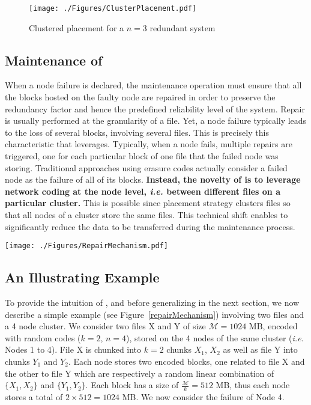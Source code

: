 \begin{figure}[t]    
\vspace{-0.8cm}
  \begin{center}    
 \texttt{[image: ./Figures/ClusterPlacement.pdf]} 
  \caption{Clustered placement for a $n=3$ redundant system}  
   \label{clusterPlacement}    
\end{center}     
   \end{figure}

\subsection{Maintenance of \crc}

When a node failure is declared, the maintenance operation must ensure that all the blocks hosted on the faulty node are repaired in order to preserve the redundancy factor and hence the predefined reliability level of the system. Repair is usually performed at the granularity of a file. Yet, a node failure typically leads to the loss of several blocks, involving several files. This is precisely this characteristic that \crc leverages. Typically, when a node fails,  multiple repairs are triggered, one for each particular block of one file that the failed node was storing.  Traditional approaches using erasure codes actually consider a failed node as the failure of all of its blocks.   \textbf{Instead, the novelty of \crc is to leverage network coding at the node level, \textit{i.e.} between different files on a particular cluster.} This is possible since \crc placement strategy clusters files so that all nodes of a cluster store the same files.  This technical shift enables to significantly reduce the data to be transferred during the maintenance process.

\begin{figure*}[t!] 
 \begin{center}    
 \texttt{[image: ./Figures/RepairMechanism.pdf]} 
    \caption{Example of a \crc repair process, for the repair of a new node in a cluster of $4$ (with $k=2, n=4$).}   
    \label{repairMechanism}   
  \end{center}     
   \end{figure*}
   
\subsection{An Illustrating Example}
To provide the intuition of \crc, and before generalizing in the next
section, we now describe a simple example (see
Figure~\ref{repairMechanism}) involving  two files and a 4 node
cluster.  We consider two files X and Y of size $\mathcal{M}=1024$ MB, encoded with
random codes ($k=2$, $n=4$), stored on the 4 nodes of the same cluster
(\textit{i.e.} Nodes 1 to 4). File X is chunked into $k=2$ chunks $X_1$, $X_2$ as well as file Y into chunks $Y_1$ and $Y_2$. Each node stores two encoded blocks, one related to file X and the other to file Y which are respectively a random linear combination of $\lbrace X_1,X_2 \rbrace$ and $\lbrace Y_1,Y_2 \rbrace$. Each block has a size of $\frac{\mathcal{M}}{k}=512$ MB, thus each
node stores a total of $2\times512=1024$ MB.  We now consider the
failure of Node 4.

